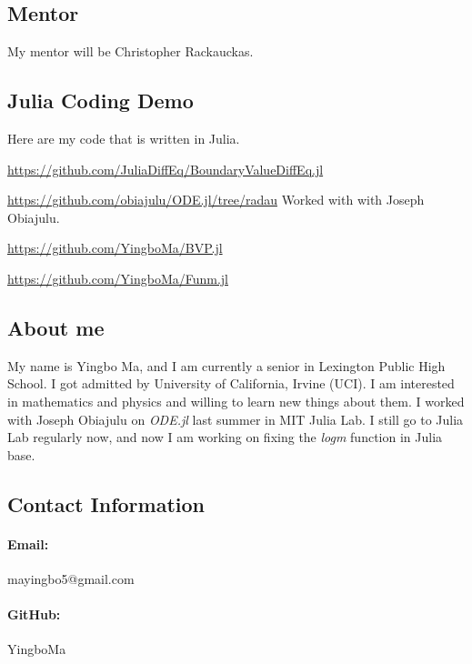 \documentclass[a4paper,12pt,onecolumn]{article}
\begin{document}
\subsection{Mentor} %
\label{sub:mentor}
My mentor will be Christopher Rackauckas.



\subsection{Julia Coding Demo} %
\label{ssub:julia_coding_demo}
Here are my code that is written in Julia.

\url{https://github.com/JuliaDiffEq/BoundaryValueDiffEq.jl}

\url{https://github.com/obiajulu/ODE.jl/tree/radau} Worked with with Joseph Obiajulu.

\url{https://github.com/YingboMa/BVP.jl}

\url{https://github.com/YingboMa/Funm.jl}

\subsection{About me} %
\label{ssub:about_me}
My name is Yingbo Ma, and I am currently a senior in Lexington Public High School. I got admitted by
University of California, Irvine (UCI). I am interested in mathematics and physics and willing to
learn new things about them. I worked with Joseph Obiajulu on \textit{ODE.jl} last summer in MIT
Julia Lab. I still go to Julia Lab regularly now, and now I am working on fixing the \textit{logm}
function in Julia base.

\subsection{Contact Information} %
\label{ssub:contact_information}
\paragraph{Email:} mayingbo5@gmail.com

\paragraph{GitHub:} YingboMa

\end{document}
